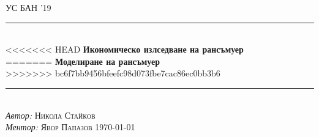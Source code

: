 \documentclass[11pt, a4paper]{article}
\theoremstyle{definition}
\begin{document}
\begin{titlepage}
	\newcommand{\HRule}{\rule{\linewidth}{0.5mm}}
	\centering
	\textsc{\LARGE УС БАН '19}\\[1cm]
	\HRule\\[1 cm]
	
<<<<<<< HEAD
	{\huge\bfseries Икономическо излседване на рансъмуер }\\[0.5 cm] 
=======
	{\huge\bfseries Моделиране на рансъмуер }\\[0.5 cm] 
>>>>>>> bc6f7bb9456bfeefc98d073fbe7cac86ec0bb3b6
	\HRule\\
    \vfill
			\Large
			\textit{Автор:}
			 \textsc{Никола Стайков}\\
             \vspace{2cm}
			\Large
			\textit{Ментор:}
            \textsc{Явор Папазов}
    \vfill	
	{\large\today}   
	\vfill
\end{titlepage}

\tableofcontents
\newpage
\begin{abstract}
		Рансъмуер е вид компютърен вирус, който критптира файловете на дадена система и изисква да бъде платен откуп, за да бъдат декриптирани. Приемаме, че създателите на рансъмуер не знаят цената на данните на техните жертви, или по-точно колко техните жертви $\dq \text{мислят} \dq$ , че струват данните им. Те могат да правят малки проучвания преди да започнат основната кампания с цел да определят гореспоменатото разпределение. Този проект разглежда модел, чрез който да бъдат определени оптималните параметри за едно такова проучване. Този подход е ключов за намирането на оптималната цена за откупа.
\end{abstract}
\end{document}
